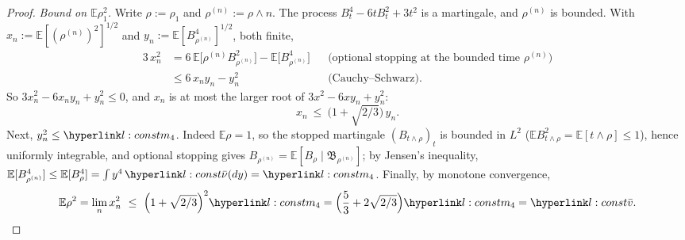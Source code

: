 \documentclass[11pt]{article}
\newcommand{\E}{\mathbb{E}}
\newcommand{\1}{\mathbf{1}}
\begin{document}
\begin{proof}
\textit{Bound on $\E\rho_1^2$.} Write $\rho:=\rho_1$ and $\rho^{(n)}:=\rho\wedge n$. The process $B_t^4-6tB_t^2+3t^2$ is a martingale, and $\rho^{(n)}$ is bounded. With
$x_n:=\E[(\rho^{(n)})^2]^{1/2}$ and $y_n:=\E[B_{\rho^{(n)}}^4]^{1/2}$, both finite,
\begin{align*}
3\,x_n^2&=6\,\E\big[\rho^{(n)}B_{\rho^{(n)}}^2\big]-\E\big[B_{\rho^{(n)}}^4\big] &&\text{(optional stopping at the bounded time }\rho^{(n)}\text{)}\\
&\le6\,x_ny_n-y_n^2 &&\text{(Cauchy--Schwarz).}
\end{align*}
So $3x_n^2-6x_ny_n+y_n^2\le0$, and $x_n$ is at most the larger root of $3x^2-6xy_n+y_n^2$:
\[
x_n\ \le\ \Big(1+\sqrt{2/3}\Big)\,y_n .
\]
Next, $y_n^2\le\lmq$. Indeed $\E\rho=1$, so the stopped martingale $(B_{t\wedge\rho})_t$ is bounded in $L^2$ ($\E B_{t\wedge\rho}^2=\E[t\wedge\rho]\le1$), hence uniformly
integrable, and optional stopping gives $B_{\rho^{(n)}}=\E[B_\rho\mid\mathfrak B_{\rho^{(n)}}]$; by Jensen's inequality,
$\E[B_{\rho^{(n)}}^4]\le\E[B_\rho^4]=\int y^4\,\lnub(dy)=\lmq$. Finally, by monotone convergence,
\[
\E\rho^2=\lim_nx_n^2\ \le\ \Big(1+\sqrt{2/3}\Big)^2\lmq=\Big(\frac53+2\sqrt{2/3}\Big)\lmq=\lvb .\qedhere
\]
\end{proof}
\end{document}
